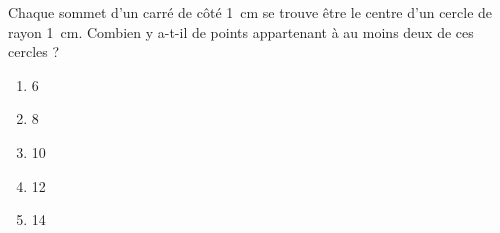 Chaque sommet d'un carré de côté 1~cm se trouve être le centre d'un cercle de rayon 1~cm. Combien y a-t-il de points appartenant à au moins deux de ces cercles ?
\begin{multicols}{5}
  \begin{enumerate}[A/]
  \item 6
  \item 8
  \item 10
  \item 12
  \item 14
  \end{enumerate}
\end{multicols}